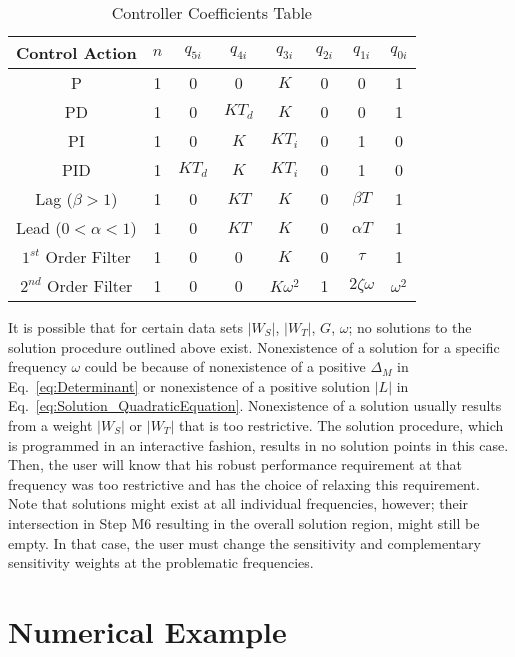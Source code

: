 \documentclass[12pt,draftcls,onecolumn]{IEEEtran}
\begin{document}
\begin{table}[!t]
\renewcommand{\arraystretch}{1.3}
\caption{Controller Coefficients Table} \label{table_example}
\centering
\begin{tabular}{c||c||c||c||c||c||c||c}
\hline
\bfseries Control Action & \bfseries $n$ & \bfseries $q_{5i}$ & \bfseries $q_{4i}$ & \bfseries $q_{3i}$ & \bfseries $q_{2i}$ & \bfseries $q_{1i}$ & \bfseries $q_{0i}$\\
\hline\hline
P & 1 & 0 & 0 & $K$ & 0 & 0 & 1 \\
\hline
PD & 1 & 0 & $K T_{d}$ & $K$ & 0 & 0 & 1 \\
\hline
PI & 1 & 0 & $K$ & $K T_{i}$ & 0 & 1 & 0 \\
\hline
PID & 1 & $K T_{d}$ & $K$ & $K T_{i}$ & 0 & 1 & 0 \\
\hline
Lag ($\beta>1$) & 1 & 0 & $K T$ & $K$ & 0 & $\beta T$ & 1 \\
\hline
Lead ($0<\alpha<1$) & 1 & 0 & $K T$ & $K$ & 0 & $\alpha T$ & 1 \\
\hline
$1^{st}$ Order Filter & 1 & 0 & 0 & $K$ & 0 & $\tau$ & 1 \\
\hline
$2^{nd}$ Order Filter & 1 & 0 & 0 & $K \omega^2$ & 1 & $2\zeta\omega$ & $\omega^2$ \\
\hline
\end{tabular}
\end{table}


It is possible that for certain data sets $\vert W_{S} \vert$, $\vert W_{T} \vert$,
$G$, $\omega$; no solutions to the solution procedure outlined
above exist. Nonexistence of a solution for a specific frequency
$\omega$ could be because of nonexistence of a positive
$\Delta_{M}$ in Eq.~\eqref{eq:Determinant} or nonexistence of a positive solution
$\vert L \vert$ in Eq.~\eqref{eq:Solution_QuadraticEquation}. Nonexistence of a solution usually results from
a weight $\vert W_{S} \vert$ or $\vert W_{T} \vert$ that is too restrictive. The
solution procedure, which is programmed in an interactive fashion,
results in no solution points in this case. Then, the user will
know that his robust performance requirement at that frequency was
too restrictive and has the choice of relaxing this requirement.
Note that solutions might exist at all individual frequencies,
however; their intersection in Step M6 resulting in the overall
solution region, might still be empty. In that case, the user must
change the sensitivity and complementary sensitivity weights at
the problematic frequencies.

\section{Numerical Example}
\end{document}
